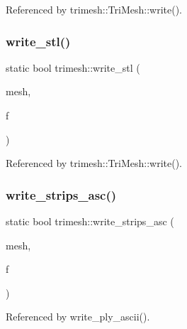 Referenced by trimesh\+::\+Tri\+Mesh\+::write().

\mbox{\label{namespacetrimesh_aeece170ed507bd3e0bb58315b2f7ee77}} 
\subsubsection{\texorpdfstring{write\+\_\+stl()}{write\_stl()}}
{\footnotesize\ttfamily static bool trimesh\+::write\+\_\+stl (\begin{DoxyParamCaption}\item[{\hyperlink{classtrimesh_1_1TriMesh}{Tri\+Mesh} $\ast$}]{mesh,  }\item[{F\+I\+LE $\ast$}]{f }\end{DoxyParamCaption})\hspace{0.3cm}{\ttfamily [static]}}



Referenced by trimesh\+::\+Tri\+Mesh\+::write().

\mbox{\label{namespacetrimesh_af23e1f26acdc3458b41fe189fee226c3}} 
\subsubsection{\texorpdfstring{write\+\_\+strips\+\_\+asc()}{write\_strips\_asc()}}
{\footnotesize\ttfamily static bool trimesh\+::write\+\_\+strips\+\_\+asc (\begin{DoxyParamCaption}\item[{\hyperlink{classtrimesh_1_1TriMesh}{Tri\+Mesh} $\ast$}]{mesh,  }\item[{F\+I\+LE $\ast$}]{f }\end{DoxyParamCaption})\hspace{0.3cm}{\ttfamily [static]}}



Referenced by write\+\_\+ply\+\_\+ascii().

\mbox{\label{namespacetrimesh_accf791e366c5f89485b9d96029db2f13}} 
